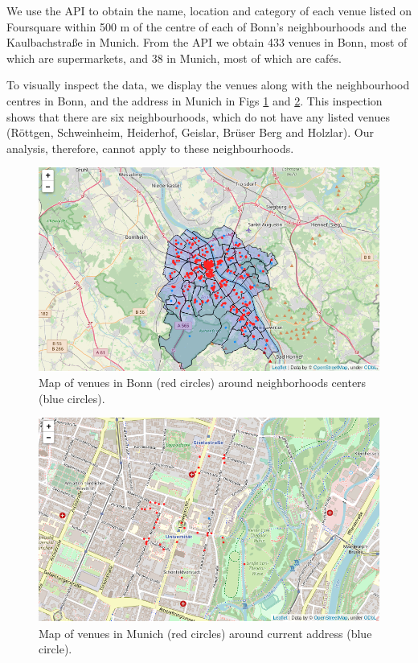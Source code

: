 \documentclass[UKenglish]{scrreprt}
\begin{document}
We use the API to obtain the name, location and category of each venue listed on Foursquare within 500 m of the centre of each of Bonn's neighbourhoods and the Kaulbachstraße in Munich. From the API we obtain 433 venues in Bonn, most of which are supermarkets, and 38 in Munich, most of which are cafés. 

To visually inspect the data, we display the venues along with the neighbourhood centres in Bonn, and the address in Munich in Figs \ref{fig:map venues_bonn} and \ref{fig:map venues_munich}. This inspection shows that there are six neighbourhoods, which do not have any listed venues (Röttgen, Schweinheim, Heiderhof, Geislar, Brüser Berg and Holzlar). Our analysis, therefore, cannot apply to these neighbourhoods.

\begin{figure}[htbp]
	\centering
	\includegraphics[width=\textwidth]{Figs/Map_Bonn_venues.png}
	\caption{Map of venues in Bonn (red circles) around neighborhoods centers (blue circles).}
	\label{fig:map venues_bonn}
\end{figure}

\begin{figure}[htbp]
	\centering
	\includegraphics[width=\textwidth]{Figs/Map_Munich_venues.png}
	\caption{Map of venues in Munich (red circles) around current address (blue circle).}
	\label{fig:map venues_munich}
\end{figure}
 
\end{document}
